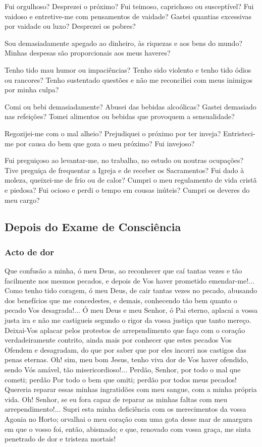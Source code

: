 Fui orgulhoso? Desprezei o próximo? Fui teimoso, caprichoso ou susceptível? Fui vaidoso e entretive-me com pensamentos de vaidade? Gastei quantias excessivas por vaidade ou luxo? Desprezei os pobres?

Sou demasiadamente apegado ao dinheiro, às riquezas e aos bens do mundo? Minhas despesas são proporcionais aos meus haveres?

Tenho tido mau humor ou impaciências? Tenho sido violento e tenho tido ódios ou rancores? Tenho sustentado questões e não me reconciliei com meus inimigos por minha culpa?

Comi ou bebi demasiadamente? Abusei das bebidas alcoólicas? Gastei demasiado nas refeições? Tomei alimentos ou bebidas que provoquem a sensualidade?

Regozijei-me com o mal alheio? Prejudiquei o próximo por ter inveja? Entristeci-me por causa do bem que goza o meu próximo? Fui invejoso?

Fui preguiçoso ao levantar-me, no trabalho, no estudo ou noutras ocupações? Tive preguiça de frequentar a Igreja e de receber os Sacramentos? Fui dado à moleza, queixei-me de frio ou de calor? Cumpri o meu regulamento de vida cristã e piedosa? Fui ocioso e perdi o tempo em cousas inúteis? Cumpri os deveres do meu cargo?

\subsection{Depois do Exame de Consciência}

\subsubsection{Acto de dor}

Que confusão a minha, ó meu Deus, ao reconhecer que caí tantas vezes e tão facilmente nos mesmos pecados, e depois de Vos haver prometido emendar-me!... Como tenho tido coragem, ó meu Deus, de cair tantas vezes no pecado, abusando dos benefícios que me concedestes, e demais, conhecendo tão bem quanto o pecado Vos desagrada!... Ó meu Deus e meu Senhor, ó Pai eterno, aplacai a vossa justa ira e não me castigueis segundo o rigor da vossa justiça que tanto mereço. Deixai-Vos aplacar pelos protestos de arrependimento que faço com o coração verdadeiramente contrito, ainda mais por conhecer que estes pecados Vos Ofendem e desagradam, do que por saber que por eles incorri nos castigos das penas eternas. Oh! sim, meu bom Jesus, tenho viva dor de Vos haver ofendido, sendo Vós amável, tão misericordioso!... Perdão, Senhor, por todo o mal que cometi; perdão Por todo o bem que omiti; perdão por todos meus pecados! Quereria reparar essas minhas ingratidões com meu sangue, com a minha própria vida. Oh! Senhor, se eu fora capaz de reparar as minhas faltas com meu arrependimento!... Supri esta minha deficiência com os merecimentos da vossa Agonia no Horto; orvalhai o meu coração com uma gota desse mar de amargura em que o vosso foi, então, abismado; e que, renovado com vossa graça, me sinta penetrado de dor e tristeza mortais!

